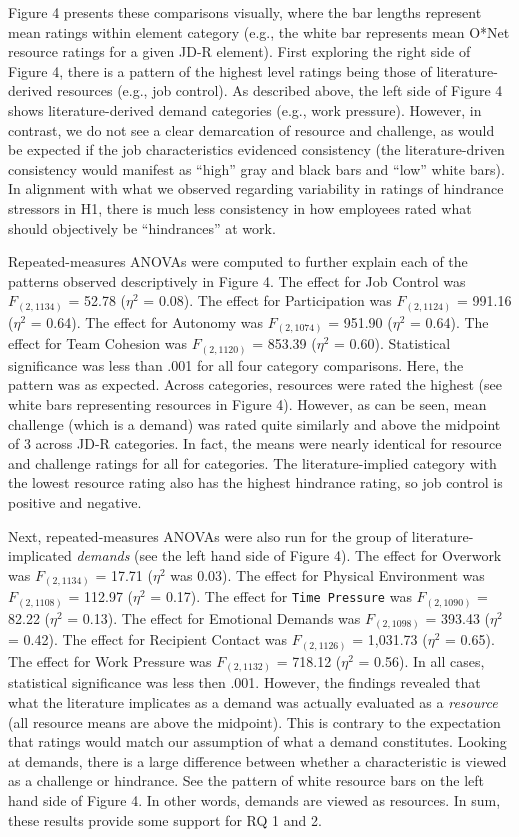 \documentclass[
  english,
  man]{apa6}
\begin{document}
Figure 4 presents these comparisons visually, where the bar lengths represent mean ratings within element category (e.g., the white bar represents mean O*Net resource ratings for a given JD-R element). First exploring the right side of Figure 4, there is a pattern of the highest level ratings being those of literature-derived resources (e.g., job control). As described above, the left side of Figure 4 shows literature-derived demand categories (e.g., work pressure). However, in contrast, we do not see a clear demarcation of resource and challenge, as would be expected if the job characteristics evidenced consistency (the literature-driven consistency would manifest as ``high'' gray and black bars and ``low'' white bars). In alignment with what we observed regarding variability in ratings of hindrance stressors in H1, there is much less consistency in how employees rated what should objectively be ``hindrances'' at work.

Repeated-measures ANOVAs were computed to further explain each of the patterns observed descriptively in Figure 4. The effect for Job Control was \(F_{(2, 1134)}\) = 52.78 (\(\eta^2\) = 0.08).
The effect for Participation was \(F_{(2, 1124)}\) = 991.16 (\(\eta^2\) = 0.64).
The effect for Autonomy was \(F_{(2, 1074)}\) = 951.90 (\(\eta^2\) = 0.64).
The effect for Team Cohesion was \(F_{(2, 1120)}\) = 853.39 (\(\eta^2\) = 0.60). Statistical significance was less than .001 for all four category comparisons. Here, the pattern was as expected. Across categories, resources were rated the highest (see white bars representing resources in Figure 4). However, as can be seen, mean challenge (which is a demand) was rated quite similarly and above the midpoint of 3 across JD-R categories. In fact, the means were nearly identical for resource and challenge ratings for all for categories. The literature-implied category with the lowest resource rating also has the highest hindrance rating, so job control is positive and negative.

Next, repeated-measures ANOVAs were also run for the group of literature-implicated \emph{demands} (see the left hand side of Figure 4). The effect for Overwork was \(F_{(2, 1134)}\) = 17.71 (\(\eta^2\) was 0.03). The effect for Physical Environment was \(F_{(2, 1108)}\) = 112.97 (\(\eta^2\) = 0.17). The effect for \texttt{Time\ Pressure} was \(F_{(2, 1090)}\) = 82.22 (\(\eta^2\) = 0.13). The effect for Emotional Demands was \(F_{(2, 1098)}\) = 393.43 (\(\eta^2\) = 0.42).
The effect for Recipient Contact was \(F_{(2, 1126)}\) = 1,031.73 (\(\eta^2\) = 0.65). The effect for Work Pressure was \(F_{(2, 1132)}\) = 718.12 (\(\eta^2\) = 0.56). In all cases, statistical significance was less then .001. However, the findings revealed that what the literature implicates as a demand was actually evaluated as a \emph{resource} (all resource means are above the midpoint). This is contrary to the expectation that ratings would match our assumption of what a demand constitutes. Looking at demands, there is a large difference between whether a characteristic is viewed as a challenge or hindrance. See the pattern of white resource bars on the left hand side of Figure 4. In other words, demands are viewed as resources. In sum, these results provide some support for RQ 1 and 2.
\end{document}

